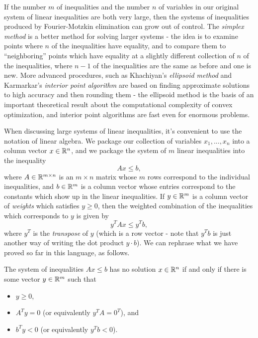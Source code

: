 If the number $m$ of inequalities and the number $n$ of variables in our original system of linear inequalities are both very large, then the systems of inequalities produced by Fourier-Motzkin elimination can grow out of control. The \emph{simplex method} is a better method for solving larger systems - the idea is to examine points where $n$ of the inequalities have equality, and to compare them to ``neighboring'' points which have equality at a slightly different collection of $n$ of the inequalities, where $n-1$ of the inequalities are the same as before and one is new. More advanced procedures, such as Khachiyan's \emph{ellipsoid method} and Karmarkar's \emph{interior point algorithm} are based on finding approximate solutions to high accuracy and then rounding them - the ellipsoid method is the basis of an important theoretical result about the computational complexity of convex optimization, and interior point algorithms are fast even for enormous problems.

When discussing large systems of linear inequalities, it's convenient to use the notation of linear algebra. We package our collection of variables $x_1, ..., x_n$ into a column vector $x \in \mathbb{R}^n$, and we package the system of $m$ linear inequalities into the inequality
\[
Ax \le b,
\]
where $A \in \mathbb{R}^{m\times n}$ is an $m\times n$ matrix whose $m$ rows correspond to the individual inequalities, and $b \in \mathbb{R}^m$ is a column vector whose entries correspond to the constants which show up in the linear inequalities. If $y \in \mathbb{R}^m$ is a column vector of \emph{weights} which satisfies $y \ge 0$, then the weighted combination of the inequalities which corresponds to $y$ is given by
\[
y^TAx \le y^Tb,
\]
where $y^T$ is the \emph{transpose} of $y$ (which is a row vector - note that $y^Tb$ is just another way of writing the dot product $y \cdot b$). We can rephrase what we have proved so far in this language, as follows.

\begin{thm} The system of inequalities $Ax \le b$ has no solution $x \in \mathbb{R}^n$ if and only if there is some vector $y \in \mathbb{R}^m$ such that
\begin{itemize}
\item $y \ge 0$,
\item $A^Ty = 0$ (or equivalently $y^TA = 0^T$), and
\item $b^Ty < 0$ (or equivalently $y^Tb < 0$).
\end{itemize}
\end{thm}

